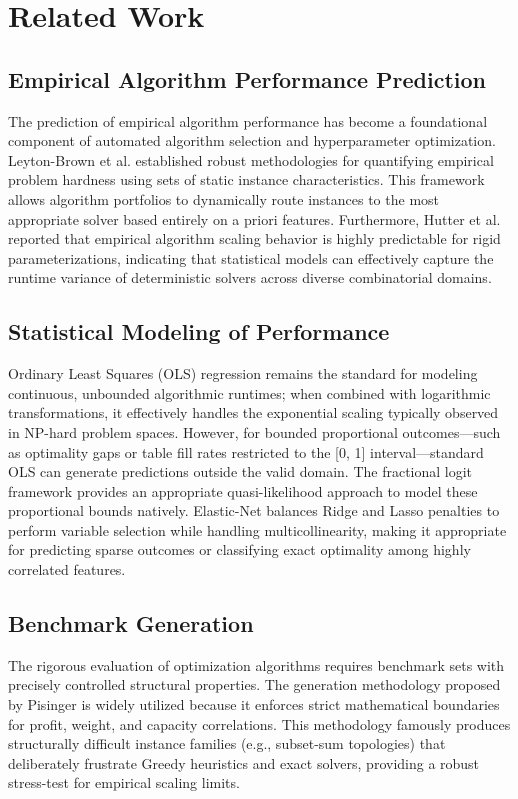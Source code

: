 \documentclass[11pt,a4paper]{article}
\begin{document}
\section{Related Work}

\subsection{Empirical Algorithm Performance Prediction}
The prediction of empirical algorithm performance has become a foundational component of automated algorithm selection and hyperparameter optimization. Leyton-Brown et al. \cite{LeytonBrown2014} established robust methodologies for quantifying empirical problem hardness using sets of static instance characteristics. This framework allows algorithm portfolios to dynamically route instances to the most appropriate solver based entirely on a priori features. Furthermore, Hutter et al. \cite{Hutter2014} reported that empirical algorithm scaling behavior is highly predictable for rigid parameterizations, indicating that statistical models can effectively capture the runtime variance of deterministic solvers across diverse combinatorial domains.

\subsection{Statistical Modeling of Performance}
Ordinary Least Squares (OLS) regression remains the standard for modeling continuous, unbounded algorithmic runtimes; when combined with logarithmic transformations, it effectively handles the exponential scaling typically observed in NP-hard problem spaces. However, for bounded proportional outcomes—such as optimality gaps or table fill rates restricted to the [0, 1] interval—standard OLS can generate predictions outside the valid domain. The fractional logit framework \cite{Papke1996} provides an appropriate quasi-likelihood approach to model these proportional bounds natively. Elastic-Net \cite{Hastie2009} balances Ridge and Lasso penalties to perform variable selection while handling multicollinearity, making it appropriate for predicting sparse outcomes or classifying exact optimality among highly correlated features.

\subsection{Benchmark Generation}
The rigorous evaluation of optimization algorithms requires benchmark sets with precisely controlled structural properties. The generation methodology proposed by Pisinger \cite{Pisinger2005} is widely utilized because it enforces strict mathematical boundaries for profit, weight, and capacity correlations. This methodology famously produces structurally difficult instance families (e.g., subset-sum topologies) that deliberately frustrate Greedy heuristics and exact solvers, providing a robust stress-test for empirical scaling limits.
\end{document}
